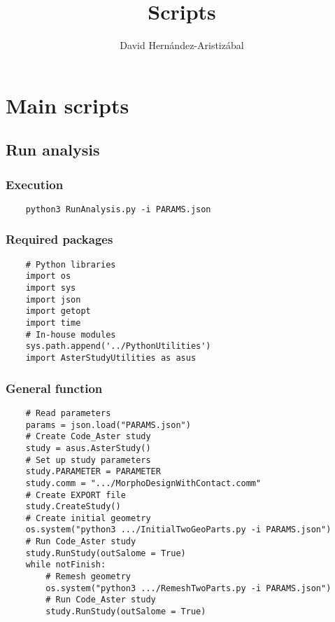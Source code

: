 \documentclass{article}
\title{Scripts}
\author{David Hernández-Aristizábal}
\begin{document}
\hypersetup{linkcolor = BlueHTML}

\maketitle
\tableofcontents

\section{Main scripts}
\subsection{Run analysis}
\subsubsection{Execution}
\begin{verbatim}
    python3 RunAnalysis.py -i PARAMS.json
\end{verbatim}
\subsubsection{Required packages}
\begin{verbatim}
    # Python libraries
    import os
    import sys
    import json
    import getopt
    import time
    # In-house modules
    sys.path.append('../PythonUtilities')
    import AsterStudyUtilities as asus
\end{verbatim}
\subsubsection{General function}
\begin{verbatim}
    # Read parameters
    params = json.load("PARAMS.json")
    # Create Code_Aster study
    study = asus.AsterStudy()
    # Set up study parameters
    study.PARAMETER = PARAMETER
    study.comm = ".../MorphoDesignWithContact.comm"
    # Create EXPORT file
    study.CreateStudy()
    # Create initial geometry
    os.system("python3 .../InitialTwoGeoParts.py -i PARAMS.json")
    # Run Code_Aster study
    study.RunStudy(outSalome = True)
    while notFinish:
        # Remesh geometry
        os.system("python3 .../RemeshTwoParts.py -i PARAMS.json")
        # Run Code_Aster study
        study.RunStudy(outSalome = True)

\end{verbatim}
\end{document}
